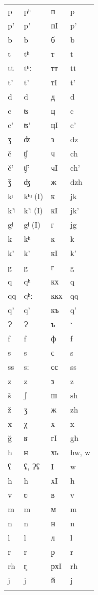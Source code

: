 \begin{longtable}{llll}
	p & pʰ & п & p \\
	p' & p' & пI & p' \\
	b & b & б & b \\
	t & tʰ & т & t \\
	tt & tʰː & тт & tt \\
	t' & t' & тI & t' \\
	d & d & д & d \\
	c & ʦ & ц & c \\
	c' & ʦ' & цI & c' \\
	ʒ & ʣ & з & dz \\
	č & ʧ & ч & ch \\
	č' & ʧ' & чI & ch' \\
	ǯ & ʤ & ж & dzh \\
	kʲ & kʰʲ (I) & к & jk \\
	k'ʲ & k'ʲ (I) & кI & jk' \\
	gʲ & gʲ (I) & г & jg \\
	k & kʰ & к & k \\
	k' & k' & кI & k' \\
	g & g & г & g \\
	q & qʰ & кх & q \\
	qq & qʰː & ккх & qq \\
	q' & q' & къ & q' \\
	Ɂ & Ɂ & ъ & ‘ \\
	f & f & ф & f \\
	s & s & с & s \\
	ss & sː & сс & ss \\
	z & z & з & z \\
	š & ʃ & ш & sh \\
	ž & ʒ & ж & zh \\
	x & χ & х & x \\
	\u{g} & ʁ& гI & gh \\
	ħ & ʜ & хь & hw, w \\
	ʕ & ʢ, Ɂʢ & I & w \\
	h & h & хI & h \\
	v & ʋ & в & v \\
	m & m & м & m \\
	n & n & н & n \\
	l & l & л & l \\
	r & r & р & r \\
	rh & r̥ & рхI & rh \\
	j & j & й & j \\
\lspbottomrule
\end{longtable}
